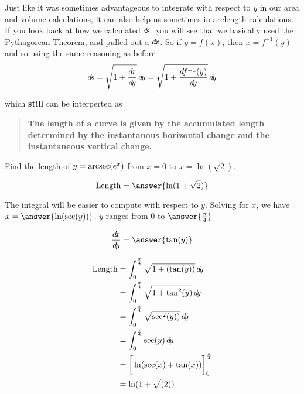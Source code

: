 \documentclass{ximera}
\begin{document}
Just like it was sometimes advantageous to integrate with respect to
$y$ in our area and volume calculations, it can also help us sometimes
in arclength calculations.  If you look back at how we calculated $\mathop{}\!d\!
s$, you will see that we basically used the Pythagorean Theorem, and
pulled out a $\mathop{}\!d\! x$.  So if $y = f(x)$, then $x = f^{-1}(y)$ and so
using the same reasoning as before
\[
\d s = \sqrt{1+\frac{\d x}{\d y}} \d y  = \sqrt{1+\dd[f^{-1}(y)]{y}} \d y
\]
\begin{image}
\end{image}
which \textbf{still} can be interperted as
\begin{quote}
  \textbf{The length of a curve is given by the
    \textcolor{green!70!black!70!blue}{accumulated}
    \textcolor{purple!50!blue!90!black}{length determined by the
      instantanous horizontal change and the instantaneous vertical
      change}.}
\end{quote}
\begin{example}
Find the length of $y = \operatorname{arcsec}(e^x)$ from $x= 0$ to
$x=\ln(\sqrt{2})$.
\begin{explanation}
\[
\textrm{Length} = \answer{\ln(1+\sqrt{2})}
\]

  The integral will be easier to compute with respect to $y$.  Solving for $x$, we have $x = \answer{\ln(\sec(y))}$.  $y$ ranges from $0$ to $\answer{\frac{\pi}{4}}$ 

	\[
	\frac{\d x}{\d y} = \answer{\tan(y)}
	\]

	\begin{align*}
		\textrm{Length} &= \int_0^{\frac{\pi}{4}} \sqrt{1+\left( \tan(y) \right)} \d y\\
			&=\int_0^{\frac{\pi}{4}} \sqrt{1+\tan^2(y)}\d y\\
			&=\int_0^{\frac{\pi}{4}} \sqrt{\sec^2(y))}\d y\\
			&=\int_0^{\frac{\pi}{4}} \sec(y) \d y\\
			&=\eval{\ln(\sec(x)+\tan(x))}_0^\frac{\pi}{4}\\
			&=\ln(1+\sqrt(2))
	\end{align*}
\end{explanation}
\end{example}
\end{document}
